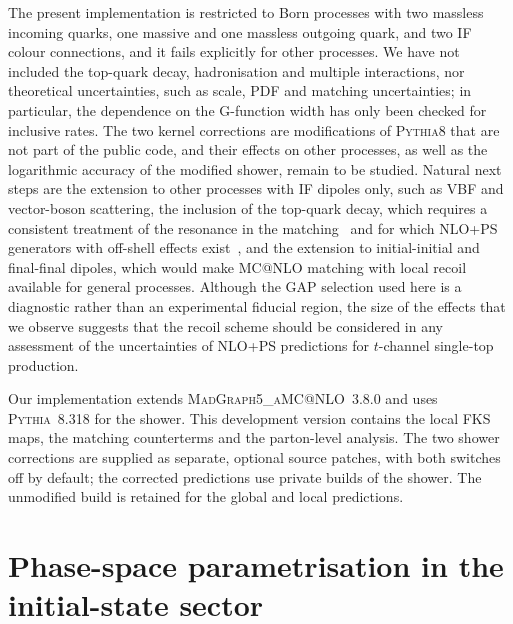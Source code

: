 \documentclass[a4paper,11pt]{article}
\makeatletter
\newcommand{\mgamc}{\textsc{MadGraph5\_aMC@NLO}\xspace}
\newcommand{\mcatnlo}{MC@NLO\xspace}
\newcommand{\pythia}{\textsc{Pythia8}\xspace}
\newcommand{\glob}{global\xspace}
\newcommand{\loc}{local\xspace}
\makeatother
\begin{document}
The present implementation is restricted to Born processes with two
massless incoming quarks, one massive and one massless outgoing quark,
and two IF colour connections, and it fails explicitly for other
processes. We have not included the top-quark decay, hadronisation
and multiple interactions, nor theoretical uncertainties, such as scale,
PDF and matching uncertainties; in particular, the dependence on the
G-function width has only been checked for inclusive rates. The two
kernel corrections are modifications of \pythia that are not part of
the public code, and their effects on other processes, as well as the
logarithmic accuracy of the modified shower, remain to be studied.
Natural next steps are the extension to other processes with IF
dipoles only, such as VBF and vector-boson scattering, the inclusion of
the top-quark decay, which requires a consistent treatment of the
resonance in the matching~\cite{Jezo:2015aia} and for which
NLO+PS generators with off-shell effects
exist~\cite{Frederix:2016rdc,vanBeekveld:2026mjv}, and the extension to
initial-initial and final-final dipoles, which would make \mcatnlo
matching with local recoil available for general processes. Although
the GAP selection used here is a diagnostic rather than an experimental
fiducial region, the size of the effects that we observe suggests that
the recoil scheme should be considered in any assessment of the
uncertainties of NLO+PS predictions for $t$-channel single-top
production.

Our implementation extends \mgamc~3.8.0 and uses
\textsc{Pythia}~8.318 for the shower. This development version
contains the local FKS maps, the matching counterterms and the
parton-level analysis. The two shower corrections are supplied as
separate, optional source patches, with both switches off by default;
the corrected predictions use private builds of the shower. The
unmodified build is retained for the \glob and \loc predictions.



\appendix

\section{Phase-space parametrisation in the initial-state sector}
\label{app:phasespace}
\end{document}

